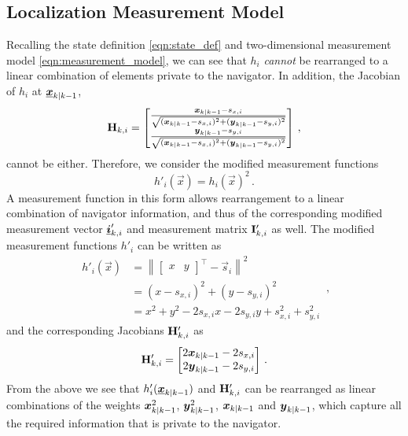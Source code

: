 \documentclass[10pt,letterpaper,oneside,twocolumn,journal]{IEEEtran}
\theoremstyle{definition}
\theoremstyle{definition}
\theoremstyle{remark}
\begin{document}
\subsection{Localization Measurement Model} \label{subsec:observation_model}
Recalling the state definition \eqref{eqn:state_def} and two-dimensional measurement model \eqref{eqn:measurement_model}, we can see that $h_i$ \textit{cannot} be rearranged to a linear combination of elements private to the navigator. In addition, the Jacobian of $h_i$ at ${\boldsymbol{\underline{x}}}_{k|k-1}$,
\begin{equation}
    {\ensuremath{{\mathbf{H}}}}_{k,i} = 
    \begin{bmatrix}
        \frac{{\boldsymbol{x}}_{k|k-1} - s_{x,i}}{\sqrt{({\boldsymbol{x}}_{k|k-1} - s_{x,i})^2 + ({\boldsymbol{y}}_{k|k-1} - s_{y,i})^2}} \\
        \frac{{\boldsymbol{y}}_{k|k-1} - s_{y,i}}{\sqrt{({\boldsymbol{x}}_{k|k-1} - s_{x,i})^2 + ({\boldsymbol{y}}_{k|k-1} - s_{y,i})^2}} 
    \end{bmatrix}\,,
\end{equation}
cannot be either. Therefore, we consider the modified measurement functions
\begin{equation}
    h'_i(\vec{x}) = h_i(\vec{x})^2\,. \label{eqn:modified_measurement_func}
\end{equation}
A measurement function in this form allows rearrangement to a linear combination of navigator information, and thus of the corresponding modified measurement vector ${\boldsymbol{\underline{i}}}'_{k,i}$ and measurement matrix ${{\mathbf{I}}}'_{k,i}$ as well. The modified measurement functions $h'_i$ can be written as
\begin{equation}
    \begin{split}
        h'_i(\vec{x}) &= \left\lVert
        \begin{bmatrix}
            x & y
        \end{bmatrix}^\top - \vec{s}_i\right\rVert^2 \\
        &= (x - s_{x,i})^2 + (y - s_{y,i})^2 \\
        &= x^2 + y^2 -2s_{x,i}x -2s_{y,i}y +s_{x,i}^2 +s_{y,i}^2
    \end{split}\,,
\end{equation}
and the corresponding Jacobians ${{\mathbf{H}}}'_{k,i}$ as
\begin{equation}
    \mat{H}'_{k,i} = 
    \begin{bmatrix}
        2\rv{x}_{k|k-1} - 2s_{x,i} \\
        2\rv{y}_{k|k-1} - 2s_{y,i}
    \end{bmatrix}\,. \label{eqn:modified_jacobian}
\end{equation}
From the above we see that $h'_i({\boldsymbol{\underline{x}}}_{k|k-1})$ and ${{\mathbf{H}}}'_{k,i}$ can be rearranged as linear combinations of the weights ${\boldsymbol{x}}_{k|k-1}^2$, ${\boldsymbol{y}}_{k|k-1}^2$, ${\boldsymbol{x}}_{k|k-1}$ and ${\boldsymbol{y}}_{k|k-1}$, which capture all the required information that is private to the navigator. 
\end{document}
